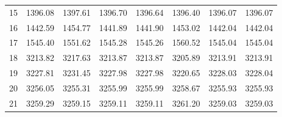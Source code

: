\documentclass[10pt,oneside]{article}
\begin{document}
\begin{table}[h!]
\begin{tabular}{cccccccc}
15 &   1396.08 & 1397.61 & 1396.70 &    1396.64 &      1396.40 & 1396.07 &   1396.07 \\
16 &   1442.59 & 1454.77 & 1441.89 &    1441.90 &      1453.02 & 1442.04 &   1442.04 \\
17 &   1545.40 & 1551.62 & 1545.28 &    1545.26 &      1560.52 & 1545.04 &   1545.04 \\
18 &   3213.82 & 3217.63 & 3213.87 &    3213.87 &      3205.89 & 3213.91 &   3213.91 \\
19 &   3227.81 & 3231.45 & 3227.98 &    3227.98 &      3220.65 & 3228.03 &   3228.04 \\
20 &   3256.05 & 3255.31 & 3255.99 &    3255.99 &      3258.67 & 3255.93 &   3255.93 \\
21 &   3259.29 & 3259.15 & 3259.11 &    3259.11 &      3261.20 & 3259.03 &   3259.03 \\
\bottomrule
\end{tabular}
\end{table}
\end{document}
